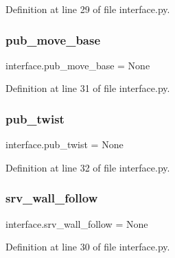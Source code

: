 Definition at line 29 of file interface.\+py.

\mbox{\label{namespaceinterface_a295379ed3912c49d4fd9d286c7f0caee}} 
\subsubsection{\texorpdfstring{pub\+\_\+move\+\_\+base}{pub\_move\_base}}
{\footnotesize\ttfamily interface.\+pub\+\_\+move\+\_\+base = None}



Definition at line 31 of file interface.\+py.

\mbox{\label{namespaceinterface_a955722b54659175cc5ea2543c976d6a4}} 
\subsubsection{\texorpdfstring{pub\+\_\+twist}{pub\_twist}}
{\footnotesize\ttfamily interface.\+pub\+\_\+twist = None}



Definition at line 32 of file interface.\+py.

\mbox{\label{namespaceinterface_a72ec0b767bae8bc1bf6b2da98c8b9737}} 
\subsubsection{\texorpdfstring{srv\+\_\+wall\+\_\+follow}{srv\_wall\_follow}}
{\footnotesize\ttfamily interface.\+srv\+\_\+wall\+\_\+follow = None}



Definition at line 30 of file interface.\+py.

